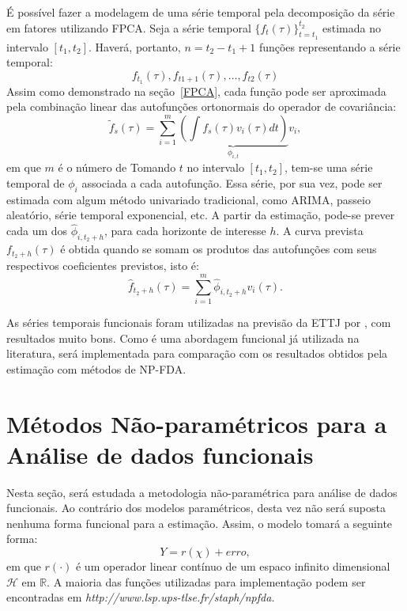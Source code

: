 \documentclass[
	12pt,				%
	openright,			%
	oneside,			%
	a4paper,			%
	english,			%
	brazil				%
	]{dissertacao-ufrgs-abntex2}
\begin{document}
É possível fazer a modelagem de uma série temporal pela decomposição da série em fatores utilizando FPCA. Seja a série temporal $\{ f_t(\tau) \}_{t=t_1}^{t_2}$ estimada no  intervalo $[t_1,t_2]$. Haverá, portanto, $n=t_2-t_1+1$ funções representando a série temporal:
\begin{equation}
f_{t_1}(\tau), f_{t1+1}(\tau), \dots, f_{t2}(\tau)
\end{equation}
Assim como demonstrado na seção~\ref{FPCA}, cada função pode ser aproximada pela combinação linear das autofunções ortonormais do operador de covariância:
\begin{equation}
\widetilde{f}_s(\tau)=\sum_{i=1}^{m}{ \underbrace{ \left(  \int f_s(\tau)  v_i(\tau)dt \right) }_{\phi_{i,t}} } v_i,
\end{equation}
em que $m$ é o número de 
Tomando $t$ no intervalo $[t_1,t_2]$, tem-se uma série temporal de $\phi_i$ associada a cada autofunção. Essa série, por sua vez, pode ser estimada com algum método univariado tradicional, como ARIMA, passeio aleatório, série temporal exponencial, etc. A partir da estimação, pode-se prever cada um dos $\hat{\phi}_{i,t_2+h}$, para cada horizonte de interesse $h$. A curva prevista $f_{t_2+h}(\tau)$ é obtida quando se somam os produtos das autofunções com seus respectivos coeficientes previstos, isto é:
\begin{equation}
\hat{f}_{t_2+h}(\tau)= \sum_{i=1}^{m}{\hat{\phi}_{i,t_2+h} v_i(\tau) }.
\end{equation}

As séries temporais funcionais foram utilizadas na previsão da ETTJ por , com resultados muito bons. Como é uma abordagem funcional já utilizada na literatura, será implementada para comparação com os resultados obtidos pela estimação com métodos de NP-FDA.

\section{Métodos Não-paramétricos para a Análise de dados funcionais}

Nesta seção, será estudada a metodologia não-paramétrica para análise
de dados funcionais. Ao contrário dos modelos paramétricos, desta
vez não será suposta nenhuma forma funcional para a estimação. Assim,
o modelo tomará a seguinte forma:
\[
Y=r(\chi)+erro,
\]
em que $r(\cdot)$ é um operador linear contínuo de um espaco infinito dimensional $\mathcal{H}$
em $\mathbb{R}$. A maioria das funções utilizadas para implementação
podem ser encontradas em \emph{http://www.lsp.ups-tlse.fr/staph/npfda. }
\end{document}
